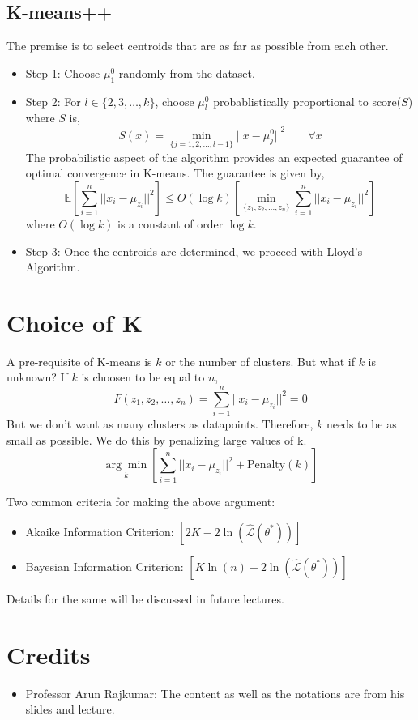 \documentclass[letterpaper,11pt]{article}
\begin{document}
\subsection{K-means++}
The premise is to select centroids that are as far as possible from each other.
\begin{itemize}
    \item Step 1: Choose $\mu _1 ^0$ randomly from the dataset.
    \item Step 2: For $l \in \{2, 3, \ldots, k\}$, choose $\mu _l ^0$ probablistically proportional to score($S$) where $S$ is,
    $$
    S(x) = \min _{\{j=1, 2, \ldots, l-1\}} {|| x - \mu _{j} ^0 ||}^2 \hspace{2em} \forall x
    $$
    The probabilistic aspect of the algorithm provides an expected guarantee of optimal convergence in K-means. The guarantee is given by,
    $$
    \mathbb{E} \left[ \sum _{i=1} ^{n} {|| x_i - \mu _{z_i} ||}^2 \right ]
    \le O(\log k) \left [ \min _{\{z_1, z_2, \ldots, z_n\}} \sum _{i=1} ^{n} {|| x_i - \mu _{z_i} ||}^2 \right ]
    $$
    where $O(\log k)$ is a constant of order $\log k$.
    \item Step 3: Once the centroids are determined, we proceed with Lloyd's Algorithm.
\end{itemize}

\section{Choice of K}
A pre-requisite of K-means is $k$ or the number of clusters. But what if $k$ is unknown? If $k$ is choosen to be equal to $n$,
$$
F(z_1, z_2, \dots, z_n) = \sum _{i=1} ^{n} {|| x_i - \mu _{z_i} ||} ^2 = 0
$$
But we don't want as many clusters as datapoints. Therefore, $k$ needs to be as small as possible. We do this by penalizing large values of k.
$$
\underset{k}{\arg \min} \left [ \sum _{i=1} ^{n} {|| x_i - \mu _{z_i} ||} ^2 + \text{Penalty}(k) \right ]
$$

\newpage
Two common criteria for making the above argument:
\begin{itemize}
    \item Akaike Information Criterion: $\left [ 2K - 2\ln(\hat{\mathcal{L}}(\theta ^*)) \right ]$
    \item Bayesian Information Criterion: $\left [ K\ln(n) - 2\ln(\hat{\mathcal{L}}(\theta ^*)) \right ]$
\end{itemize}
Details for the same will be discussed in future lectures.
 
\section{Credits}
\begin{itemize}
    \item Professor Arun Rajkumar: The content as well as the notations are from his slides and lecture.
\end{itemize}
\end{document}
